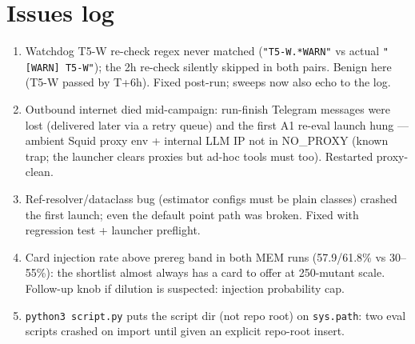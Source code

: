 \documentclass[10pt]{article}
\begin{document}
\section*{Issues log}
\begin{enumerate}
\item Watchdog T5-W re-check regex never matched (\texttt{"T5-W.*WARN"} vs actual
\texttt{"[WARN] T5-W"}); the 2h re-check silently skipped in both pairs. Benign here
(T5-W passed by T+6h). Fixed post-run; sweeps now also echo to the log.
\item Outbound internet died mid-campaign: run-finish Telegram messages were lost
(delivered later via a retry queue) and the first A1 re-eval launch hung ---
ambient Squid proxy env + internal LLM IP not in NO\_PROXY (known trap; the launcher
clears proxies but ad-hoc tools must too). Restarted proxy-clean.
\item Ref-resolver/dataclass bug (estimator configs must be plain classes) crashed
the first launch; even the default point path was broken. Fixed with regression
test + launcher preflight.
\item Card injection rate above prereg band in both MEM runs (57.9/61.8\% vs
30--55\%): the shortlist almost always has a card to offer at 250-mutant scale.
Follow-up knob if dilution is suspected: injection probability cap.
\item \texttt{python3 script.py} puts the script dir (not repo root) on
\texttt{sys.path}: two eval scripts crashed on import until given an explicit
repo-root insert.
\end{enumerate}
\end{document}
